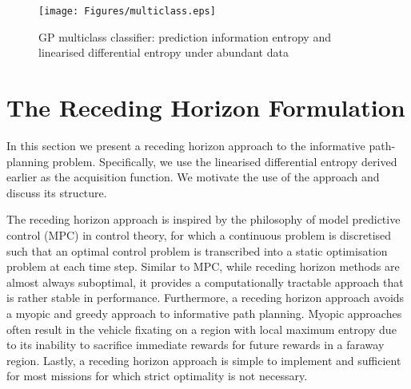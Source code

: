 			\begin{figure}[t]
			\centering
				\texttt{[image: Figures/multiclass.eps]}
			\caption{GP multiclass classifier: prediction information entropy and linearised differential entropy under abundant data}
			\label{Figure:Results:MulticlassLinearisedEntropy}
			\end{figure}
				
		
	\section{The Receding Horizon Formulation}
	\label{Informative-Seafloor-Exploration:Receding-Horizon-Formulation}
	
		In this section we present a receding horizon approach to the informative path-planning problem. Specifically, we use the linearised differential entropy derived earlier as the acquisition function. We motivate the use of the approach and discuss its structure.
		
		The receding horizon approach is inspired by the philosophy of model predictive control (MPC) in control theory, for which a continuous problem is discretised such that an optimal control problem is transcribed into a static optimisation problem at each time step. Similar to MPC, while receding horizon methods are almost always suboptimal, it provides a computationally tractable approach that is rather stable in performance. Furthermore, a receding horizon approach avoids a myopic and greedy approach to informative path planning. Myopic approaches often result in the vehicle fixating on a region with local maximum entropy due to its inability to sacrifice immediate rewards for future rewards in a faraway region. Lastly, a receding horizon approach is simple to implement and sufficient for most missions for which strict optimality is not necessary.
		
